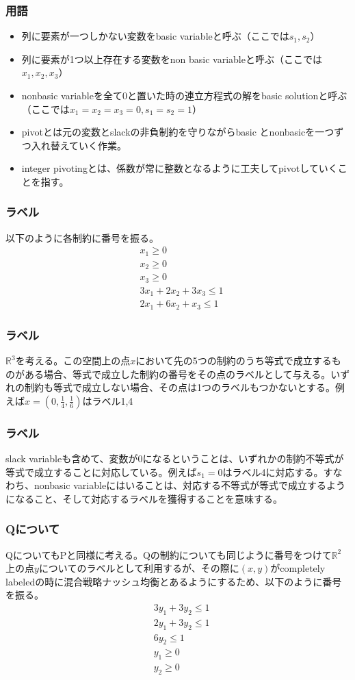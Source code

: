 \documentclass[dvipdfmx, 12pt]{beamer}
\begin{document}
\begin{frame}\frametitle{用語}
\begin{itemize}
	\item 列に要素が一つしかない変数をbasic variableと呼ぶ（ここでは$s_1, s_2$）
	\item 列に要素が1つ以上存在する変数をnon basic variableと呼ぶ（ここでは$x_1, x_2, x_3$）
	\item nonbasic variableを全て0と置いた時の連立方程式の解をbasic solutionと呼ぶ（ここでは$x_1 =  x_2 = x_3 = 0, s_1 = s_2 = 1$）
	\item pivotとは元の変数とslackの非負制約を守りながらbasic とnonbasicを一つずつ入れ替えていく作業。
	\item integer pivotingとは、係数が常に整数となるように工夫してpivotしていくことを指す。
\end{itemize}
\end{frame}

\begin{frame}\frametitle{ラベル}
以下のように各制約に番号を振る。
\begin{align}
	&x_1 \geq 0\\
	&x_2 \geq 0\\
	&x_3 \geq 0\\
	&3x_1 + 2x_2 + 3x_3 \leq 1\\
	&2x_1 + 6x_2 + x_3 \leq 1
\end{align}
\end{frame}

\begin{frame}\frametitle{ラベル}
$\mathbb{R}^3$を考える。この空間上の点$x$において先の5つの制約のうち等式で成立するものがある場合、等式で成立した制約の番号をその点のラベルとして与える。いずれの制約も等式で成立しない場合、その点は1つのラベルもつかないとする。例えば$x = (0, \frac{1}{4}, \frac{1}{6})$はラベル1,4
\end{frame}

\begin{frame}\frametitle{ラベル}
slack variableも含めて、変数が0になるということは、いずれかの制約不等式が等式で成立することに対応している。例えば$s_1 = 0$はラベル4に対応する。すなわち、nonbasic variableにはいることは、対応する不等式が等式で成立するようになること、そして対応するラベルを獲得することを意味する。
\end{frame}

\begin{frame}\frametitle{Qについて}
QについてもPと同様に考える。Qの制約についても同じように番号をつけて$\mathbb{R}^2$上の点$y$についてのラベルとして利用するが、その際に$(x, y)$がcompletely labeledの時に混合戦略ナッシュ均衡とあるようにするため、以下のように番号を振る。
\setcounter{equation}{0}
\begin{align}
	&3y_1 + 3y_2 \leq 1\\
	&2y_1 + 3y_2 \leq 1\\
	& 6y_2 \leq 1\\
	&y_1 \geq 0\\
	&y_2 \geq 0
\end{align}
\end{frame}
\end{document}
